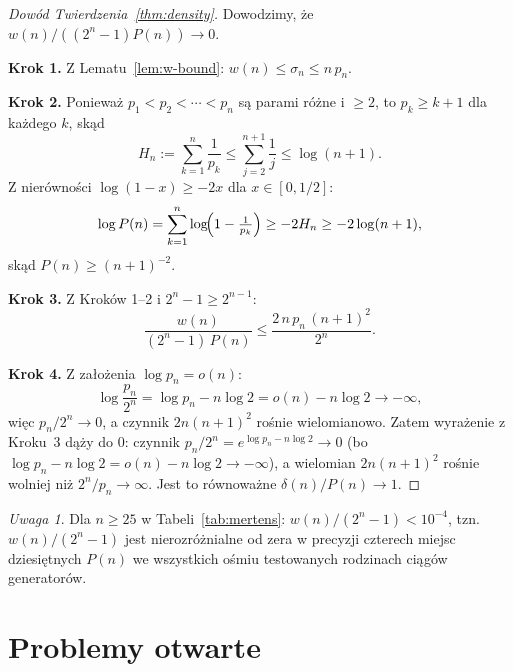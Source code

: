 \documentclass[11pt,a4paper]{amsart}
\theoremstyle{plain}
\theoremstyle{definition}
\theoremstyle{remark}
\newtheorem{remark}[theorem]{Uwaga}
\begin{document}
\begin{proof}[Dowód Twierdzenia~\ref{thm:density}]
Dowodzimy, że $w(n)/((2^n-1) P(n)) \to 0$.

\textbf{Krok 1.}
Z Lematu~\ref{lem:w-bound}: $w(n) \leq \sigma_n \leq n\,p_n$.

\textbf{Krok 2.}
Ponieważ $p_1 < p_2 < \cdots < p_n$ są parami różne i $\geq 2$,
to $p_k \geq k+1$ dla każdego $k$, skąd
\[
  H_n := \sum_{k=1}^n \frac{1}{p_k} \leq \sum_{j=2}^{n+1} \frac{1}{j} \leq \log(n+1).
\]
Z nierówności $\log(1-x) \geq -2x$ dla $x \in [0, 1/2]$:
\[
  \log P(n) = \sum_{k=1}^n \log\!\Bigl(1 - \tfrac{1}{p_k}\Bigr)
  \geq -2H_n \geq -2\log(n+1),
\]
skąd $P(n) \geq (n+1)^{-2}$.

\textbf{Krok 3.}
Z Kroków 1--2 i $2^n - 1 \geq 2^{n-1}$:
\[
  \frac{w(n)}{(2^n-1)\,P(n)} \leq \frac{2\,n\,p_n\,(n+1)^2}{2^n}.
\]

\textbf{Krok 4.}
Z założenia $\log p_n = o(n)$:
\[
  \log\frac{p_n}{2^n} = \log p_n - n\log 2 = o(n) - n\log 2 \to -\infty,
\]
więc $p_n / 2^n \to 0$, a czynnik $2n(n+1)^2$ rośnie wielomianowo.
Zatem wyrażenie z Kroku~3 dąży do $0$:
czynnik $p_n/2^n = e^{\log p_n - n\log 2} \to 0$
(bo $\log p_n - n\log 2 = o(n) - n\log 2 \to -\infty$),
a wielomian $2n(n+1)^2$ rośnie wolniej niż $2^n/p_n \to \infty$.
Jest to równoważne $\delta(n)/P(n) \to 1$.
\end{proof}

\begin{remark}
\label{rem:density-empirical}
Dla $n \geq 25$ w Tabeli~\ref{tab:mertens}:
$w(n)/(2^n-1) < 10^{-4}$, tzn.\ $w(n)/(2^n-1)$ jest
nierozróżnialne od zera w precyzji czterech miejsc dziesiętnych
$P(n)$ we wszystkich ośmiu testowanych rodzinach ciągów generatorów.
\end{remark}

\section{Problemy otwarte}
\label{sec:open}
\end{document}
